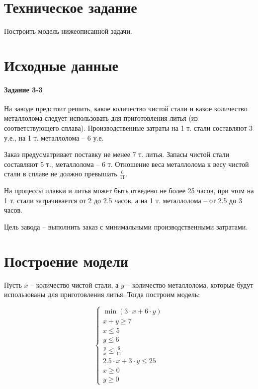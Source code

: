 





\section{Техническое задание}

Построить модель нижеописанной задачи.

\section{Исходные данные}

\paragraph{Задание 3-3}

На заводе предстоит решить, какое количество чистой стали и какое количество металлолома следует использовать для приготовления литья (из соответствующего сплава). Производственные затраты на 1 т. стали составляют 3 у.е., на 1 т. металлолома -- 6 у.е. 

Заказ предусматривает поставку не менее 7 т. литья. Запасы чистой стали составляют 5 т., металлолома – 6 т. Отношение веса металлолома к весу чистой стали в сплаве не должно превышать $\frac{6}{11}$.

На процессы плавки и литья может быть отведено не более 25 часов, при этом на
1 т. стали затрачивается от 2 до 2.5 часов, а на 1 т. металлолома – от 2.5 до 3 часов.

Цель завода -- выполнить заказ с минимальными производственными затратами. 

\section{Построение модели}

Пусть $x$ -- количество чистой стали, а $y$ -- количество металлолома, которые будут использованы для приготовления литья. Тогда построим модель: 

\begin{equation*}
\begin{cases} 
\min(3 \cdot x + 6 \cdot y) \\
x + y \ge 7 \\ 
x \le 5 \\ 
y \le 6 \\
\frac{y}{x} \le \frac{6}{11} \\
2.5 \cdot x + 3 \cdot y \le 25 \\
x \ge 0 \\
y \ge 0
\end{cases}
\end{equation*}

